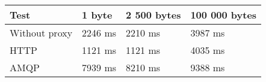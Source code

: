\begin{tabularx}{\textwidth}{llll}
\hline
 Test          & 1 byte   & 2 500 bytes   & 100 000 bytes   \\
\hline
 Without proxy & 2246 ms  & 2210 ms       & 3987 ms         \\
 HTTP          & 1121 ms  & 1121 ms       & 4035 ms         \\
 AMQP          & 7939 ms  & 8210 ms       & 9388 ms         \\
\hline
\end{tabularx}